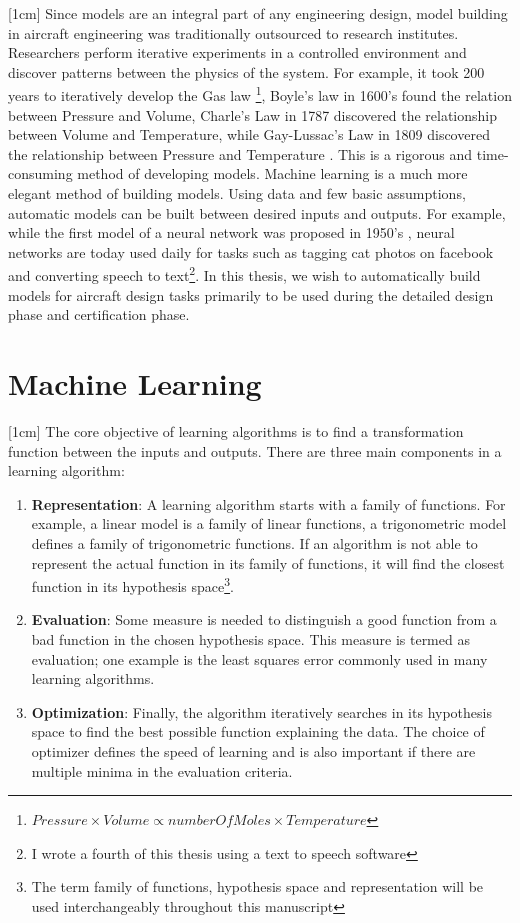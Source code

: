 [1cm]
Since models are an integral part of any engineering design, model building in aircraft engineering was traditionally outsourced to research institutes. Researchers perform iterative experiments in a controlled environment and discover patterns between the physics of the system. For example, it took 200 years to iteratively develop the Gas law \footnote{$Pressure \times Volume \propto numberOfMoles \times Temperature$}, Boyle's law in 1600's found the relation between Pressure and Volume, Charle's Law in 1787 discovered the relationship between Volume and Temperature, while Gay-Lussac's Law in 1809 discovered the relationship between Pressure and Temperature \cite{clapeyron1834memoire}. This is a rigorous and time-consuming method of developing models. Machine learning is a much more elegant method of building models. Using data and few basic assumptions, automatic models can be built between desired inputs and outputs. For example, while the first model of a neural network was proposed in 1950's \cite{kleene1951representation}, neural networks are today used daily for tasks such as tagging cat photos on facebook and converting speech to text\footnote{I wrote a fourth of this thesis using a text to speech software}. In this thesis, we wish to automatically build models for aircraft design tasks primarily to be used during the detailed design phase and certification phase. 


\section{Machine Learning}\label{secMachineLearning}
[1cm]
The core objective of learning algorithms is to find a transformation function between the inputs and outputs. There are three main components in a learning algorithm:
\begin{enumerate}
\item \textbf{Representation}: A learning algorithm starts with a family of functions. For example, a linear model is a family of linear functions, a trigonometric model defines a family of trigonometric functions. If an algorithm is not able to represent the actual function in its family of functions, it will find the closest function in its hypothesis space\footnote{The term family of functions, hypothesis space and representation will be used interchangeably throughout this manuscript}.
\item \textbf{Evaluation}: Some measure is needed to distinguish a good function from a bad function in the chosen hypothesis space. This measure is termed as evaluation; one example is the least squares error commonly used in many learning algorithms. 
\item \textbf{Optimization}: Finally, the algorithm iteratively searches in its hypothesis space to find the best possible function explaining the data. The choice of optimizer defines the speed of learning and is also important if there are multiple minima in the evaluation criteria.
\end{enumerate}

